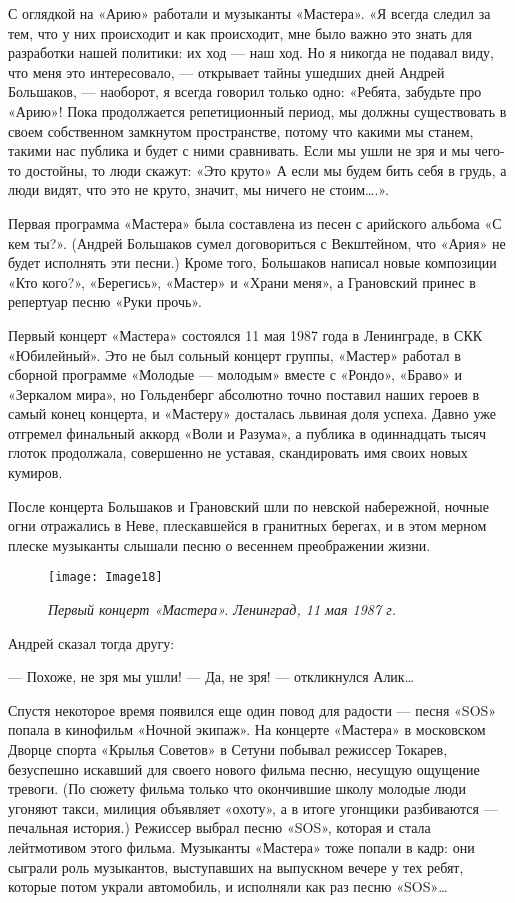 \documentclass[16pt,a5paper,oneside]{book}
\begin{document}
С оглядкой на «Арию» работали и музыканты «Мастера». «Я всегда следил за тем, что у них происходит и как происходит, мне
было важно это знать для разработки нашей политики: их ход — наш ход. Но я никогда не подавал виду, что меня это
интересовало, — открывает тайны ушедших дней Андрей Большаков, — наоборот, я всегда говорил только одно: «Ребята,
забудьте про «Арию»! Пока продолжается репетиционный период, мы должны существовать в своем собственном замкнутом
пространстве, потому что какими мы станем, такими нас публика и будет с ними сравнивать. Если мы ушли не зря и мы
чего-то достойны, то люди скажут: «Это круто» А если мы будем бить себя в грудь, а люди видят, что это не круто, значит,
мы ничего не стоим\ldots.».

Первая программа «Мастера» была составлена из песен с арийского альбома «С кем ты?». (Андрей Большаков сумел
договориться с Векштейном, что «Ария» не будет исполнять эти песни.) Кроме того, Большаков написал новые композиции
«Кто кого?», «Берегись», «Мастер» и «Храни меня», а Грановский принес в репертуар песню «Руки прочь».

Первый концерт «Мастера» состоялся 11 мая 1987 года в Ленинграде, в СКК «Юбилейный». Это не был сольный концерт группы,
«Мастер» работал в сборной программе «Молодые — молодым» вместе с «Рондо», «Браво» и «Зеркалом мира», но Гольденберг
абсолютно точно поставил наших героев в самый конец концерта, и «Мастеру» досталась львиная доля успеха. Давно уже
отгремел финальный аккорд «Воли и Разума», а публика в одиннадцать тысяч глоток продолжала, совершенно не уставая,
скандировать имя своих новых кумиров.

После концерта Большаков и Грановский шли по невской набережной, ночные огни отражались в Неве, плескавшейся в гранитных
берегах, и в этом мерном плеске музыканты слышали песню о весеннем преображении жизни.

\begin{figure}
    \centering
    \texttt{[image: Image18]}
    \caption{\textit{Первый концерт «Мастера». Ленинград, 11 мая 1987 г.}}
\end{figure}

Андрей сказал тогда другу:

— Похоже, не зря мы ушли!
— Да, не зря! — откликнулся Алик\ldots

Спустя некоторое время появился еще один повод для радости — песня «SOS» попала в кинофильм «Ночной экипаж». На концерте
«Мастера» в московском Дворце спорта «Крылья Советов» в Сетуни побывал режиссер Токарев, безуспешно искавший для своего
нового фильма песню, несущую ощущение тревоги. (По сюжету фильма только что окончившие школу молодые люди угоняют такси,
милиция объявляет «охоту», а в итоге угонщики разбиваются — печальная история.) Режиссер выбрал песню «SOS», которая и
стала лейтмотивом этого фильма. Музыканты «Мастера» тоже попали в кадр: они сыграли роль музыкантов, выступавших на
выпускном вечере у тех ребят, которые потом украли автомобиль, и исполняли как раз песню «SOS»\ldots
\end{document}
